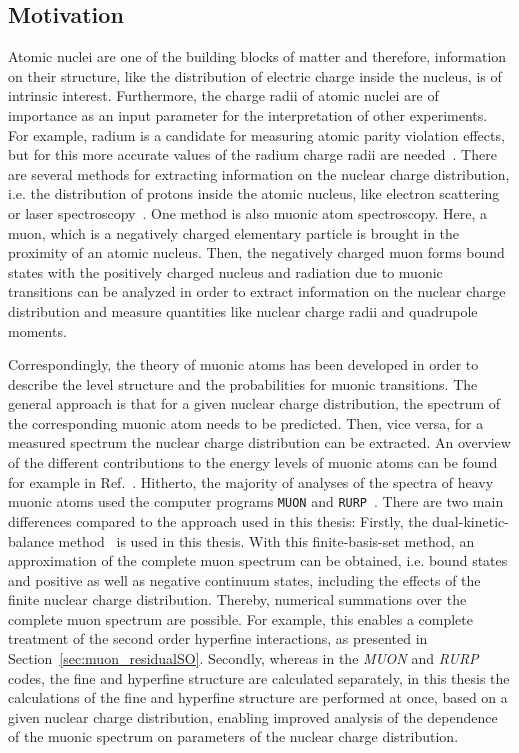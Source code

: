 \subsection{Motivation}
\label{sec:muon_motivation}
Atomic nuclei are one of the building blocks of matter and therefore, information on their structure, like the distribution of electric charge inside the nucleus, is of intrinsic interest. Furthermore, the charge radii of atomic nuclei are of importance as an input parameter for the interpretation of other experiments. For example, radium is a candidate for measuring atomic parity violation effects, but for this more accurate values of the radium charge radii are needed~\cite{wansbeek2012}.
There are several methods for extracting information on the nuclear charge distribution, i.e. the distribution of protons inside the atomic nucleus, like electron scattering~\cite{devries1987} or laser spectroscopy~\cite{wang2004,dewitte2007,mueller2007}. One method is also muonic atom spectroscopy. Here, a muon, which is a negatively charged elementary particle is brought in the proximity of an atomic nucleus. Then, the negatively charged muon forms bound states with the positively charged nucleus and radiation due to muonic transitions can be analyzed in order to extract information on the nuclear charge distribution and measure quantities like nuclear charge radii and quadrupole moments.

Correspondingly, the theory of muonic atoms has been developed in order to describe the level structure and the probabilities for muonic transitions. The general approach is that for a given nuclear charge distribution, the spectrum of the corresponding muonic atom needs to be predicted. Then, vice versa, for a measured spectrum the nuclear charge distribution can be extracted. An overview of the different contributions to the energy levels of muonic atoms can be found for example in Ref.~\cite{BorieRinker1982}. Hitherto, the majority of analyses of the spectra of heavy muonic atoms used the computer programs \texttt{MUON} and \texttt{RURP}~\cite{rinker1979}. There are two main differences compared to the approach used in this thesis:
Firstly, the dual-kinetic-balance method~\cite{Shabaev2004} is used in this thesis. With this finite-basis-set method, an approximation of the complete muon spectrum can be obtained, i.e. bound states and positive as well as negative continuum states, including the effects of the finite nuclear charge distribution. Thereby, numerical summations over the complete muon spectrum are possible. For example, this enables a complete treatment of the second order hyperfine interactions, as presented in Section~\ref{sec:muon_residualSO}.
Secondly, whereas in the \textit{MUON} and \textit{RURP} codes, the fine and hyperfine structure are calculated separately, in this thesis the calculations of the fine and hyperfine structure are performed at once, based on a given nuclear charge distribution, enabling improved analysis of the dependence of the muonic spectrum on parameters of the nuclear charge distribution.

